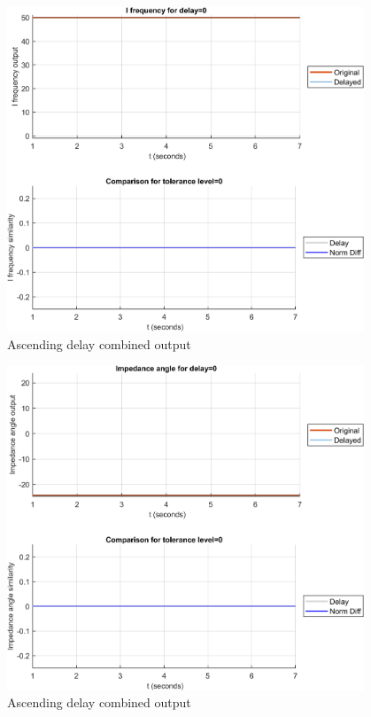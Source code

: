 \begin{figure}[hb]
    \includegraphics[width=0.95\textwidth]{PMUsim-figures/DelayOf_0/Zero_iFrequency_0.png}    
    \caption{Ascending delay combined output}
    \label{fig:PMUsim_Zero_iFrequency_0}
\end{figure}

\begin{figure}[hb]
    \includegraphics[width=0.95\textwidth]{PMUsim-figures/DelayOf_0/Zero_iAngle_0.png}    
    \caption{Ascending delay combined output}
    \label{fig:PMUsim_Zero_iAngle_0}
\end{figure}

